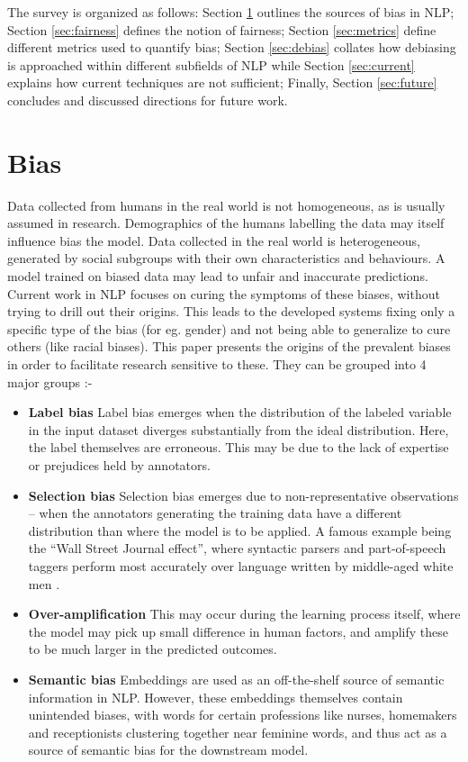 \documentclass[11pt,a4paper]{article}
\begin{document}
The survey is organized as follows: Section \ref{sec:bias} outlines the sources of bias in NLP; Section \ref{sec:fairness} defines the notion of fairness; Section \ref{sec:metrics} define different metrics used to quantify bias; Section \ref{sec:debias} collates how debiasing is approached within different subfields of NLP while Section \ref{sec:current} explains how current techniques are not sufficient; Finally, Section \ref{sec:future} concludes and discussed directions for future work.

\section{Bias}
\label{sec:bias}
Data collected from humans in the real world is not homogeneous, as is usually assumed in research. Demographics of the humans labelling the data may itself influence bias the model. Data collected in the real world is heterogeneous, generated by social subgroups with their own characteristics and behaviours. A model trained on biased data may lead to unfair and inaccurate predictions. Current work in NLP focuses on curing the symptoms of these biases, without trying to drill out their origins. This leads to the developed systems fixing only a specific type of the bias (for eg. gender) and not being able to generalize to cure others (like racial biases). This paper presents the origins of the prevalent biases in order to facilitate research sensitive to these. They can be grouped into 4 major groups \cite{shah2019predictive} :-

\begin{itemize}
    \item \textbf{Label bias} Label bias emerges when the distribution of the labeled variable in the input dataset diverges substantially from the ideal distribution. Here, the label themselves are erroneous. This may be due to the lack of expertise or prejudices held by annotators.
    \item \textbf{Selection bias} Selection bias emerges due to non-representative observations – when the annotators generating the training data have a different distribution than where the model is to be applied. A famous example being the ``Wall Street Journal effect”, where syntactic parsers and part-of-speech taggers perform most accurately over language written by middle-aged white men \cite{garimella-etal-2019-womens}.
    \item \textbf{Over-amplification} This may occur during the learning process itself, where the model may pick up small difference in human factors, and amplify these to be much larger in the predicted outcomes. 
    \item \textbf{Semantic bias} Embeddings are used as an off-the-shelf source of semantic information in NLP. However, these embeddings themselves contain unintended biases, with words for certain professions like nurses, homemakers and receptionists clustering together near feminine words, and thus act as a source of semantic bias for the downstream model.
\end{itemize}
\end{document}
